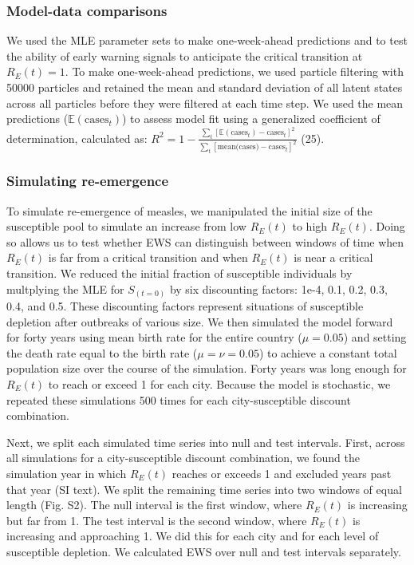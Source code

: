 \documentclass[3p]{elsarticle} %
\begin{document}
\subsubsection{Model-data comparisons}\label{model-data-comparisons}

We used the MLE parameter sets to make one-week-ahead predictions and to
test the ability of early warning signals to anticipate the critical
transition at \(R_E(t) = 1\). To make one-week-ahead predictions, we
used particle filtering with 50000 particles and retained the mean and
standard deviation of all latent states across all particles before they
were filtered at each time step. We used the mean predictions
(\(\mathbb{E}(\text{cases}_t)\)) to assess model fit using a generalized
coefficient of determination, calculated as:
\(R^2 = 1 - \frac{\sum_t [\mathbb{E}(\text{cases}_t) - \text{cases}_t]^2}{\sum_t [\text{mean(cases)}-\text{cases}_t]^2}\)
(25).

\subsubsection{Simulating re-emergence}\label{simulating-re-emergence}

To simulate re-emergence of measles, we manipulated the initial size of
the susceptible pool to simulate an increase from low \(R_E(t)\) to high
\(R_E(t)\). Doing so allows us to test whether EWS can distinguish
between windows of time when \(R_E(t)\) is far from a critical
transition and when \(R_E(t)\) is near a critical transition. We reduced
the initial fraction of susceptible individuals by multplying the MLE
for \(S_{(t=0)}\) by six discounting factors: 1e-4, 0.1, 0.2, 0.3, 0.4,
and 0.5. These discounting factors represent situations of susceptible
depletion after outbreaks of various size. We then simulated the model
forward for forty years using mean birth rate for the entire country
(\(\mu = 0.05\)) and setting the death rate equal to the birth rate
(\(\mu = \nu = 0.05\)) to achieve a constant total population size over
the course of the simulation. Forty years was long enough for \(R_E(t)\)
to reach or exceed 1 for each city. Because the model is stochastic, we
repeated these simulations 500 times for each city-susceptible discount
combination.

Next, we split each simulated time series into null and test intervals.
First, across all simulations for a city-susceptible discount
combination, we found the simulation year in which \(R_E(t)\) reaches or
exceeds 1 and excluded years past that year (SI text). We split the
remaining time series into two windows of equal length (Fig. S2). The
null interval is the first window, where \(R_E(t)\) is increasing but
far from 1. The test interval is the second window, where \(R_E(t)\) is
increasing and approaching 1. We did this for each city and for each
level of susceptible depletion. We calculated EWS over null and test
intervals separately.
\end{document}
